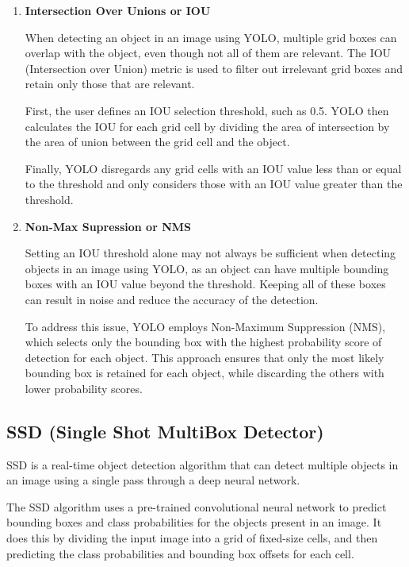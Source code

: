 \begin{enumerate}
    \item \textbf{Intersection Over Unions or IOU}

          When detecting an object in an image using YOLO, multiple grid boxes can
          overlap with the object, even though not all of them are relevant. The IOU
          (Intersection over Union) metric is used to filter out irrelevant grid boxes
          and retain only those that are relevant.

          First, the user defines an IOU selection threshold, such as 0.5. YOLO then
          calculates the IOU for each grid cell by dividing the area of intersection by
          the area of union between the grid cell and the object.

          Finally, YOLO disregards any grid cells with an IOU value less than or equal to
          the threshold and only considers those with an IOU value greater than the
          threshold.

    \item \textbf{Non-Max Supression or NMS}

          Setting an IOU threshold alone may not always be sufficient when detecting
          objects in an image using YOLO, as an object can have multiple bounding boxes
          with an IOU value beyond the threshold. Keeping all of these boxes can result
          in noise and reduce the accuracy of the detection.

          To address this issue, YOLO employs Non-Maximum Suppression (NMS), which
          selects only the bounding box with the highest probability score of detection
          for each object. This approach ensures that only the most likely bounding box
          is retained for each object, while discarding the others with lower probability
          scores.

\end{enumerate}

\subsection{SSD (Single Shot MultiBox Detector)}
SSD is a real-time object detection algorithm that can detect multiple objects
in an image using a single pass through a deep neural network.

The SSD algorithm uses a pre-trained convolutional neural network to predict
bounding boxes and class probabilities for the objects present in an image. It
does this by dividing the input image into a grid of fixed-size cells, and then
predicting the class probabilities and bounding box offsets for each cell.
\cite{ssdalgo:SSD-algorithm}

